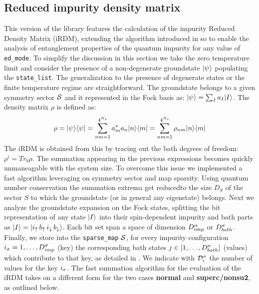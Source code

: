 \documentclass[edipack2.tex]{subfiles}
\begin{document}
\subsection{Reduced impurity density matrix}\label{sSecRDM}
This version of the \NAME library features the calculation of the
impurity Reduced Density Matrix (iRDM), extending the algorithm introduced in  so to enable the analysis of
entanglement properties of the quantum impurity for any value of {\tt
  ed\_mode}.
To simplify the discussion in this section we take the zero
temperature limit and consider the presence of a non-degenerate
groundstate $|\psi\rangle$ populating the {\tt state\_list}.
The generalization to the presence of degenerate states or the finite
temperature regime are straightforward.
The groundstate belongs to a given symmetry sector ${\cal S}$ and it
represented in the Fock basis as:  $|\psi\rangle = \sum_I a_I |I\rangle$. 
The density matrix $\rho$ is defined as:
$$
\rho = |\psi\rangle\langle \psi| = \sum_{nm=1}^{4^{N_s}} a^*_ma_n |n\rangle\langle m| =\sum_{nm=1}^{4^{N_s}} \rho_{nm} |n\rangle\langle m| 
$$
The iRDM is obtained from this by tracing out the bath degrees of
freedom: $\rho^{i}=Tr_{b}\rho$. The summation appearing in the
previous expressions becomes quickly unmaneagable with the system
size. To overcome this issue we implemented a fast algorithm
leveraging on symmetry sector and map sparsity.
Using quantum number conservation the summation extrema get reducedto
the size $D_S$ of the sector $S$ to which the groundstate (or in
general any eigenstate) belongs. 
Next we analyze the groundstate expansion on the Fock states, splitting the bit representation of any state $|I\rangle$ into
their spin-dependent impurity and bath parts as $|I\rangle = |
  i_\uparrow\,  b_\uparrow\, i_\downarrow \, b_\downarrow\rangle$. Each bit
set span a space of dimension $D^\alpha_{imp}$ or $D^\sigma_{bath}$. 
Finally, we store into the {\tt sparse\_map} ${\cal S}$, for every impurity configuration 
$i_\sigma =1,\dots,D^\sigma_{imp}$ (key) the corresponding bath states $j\in[1,\dots,D^\sigma_{bath}]$
(values) which contribute to that key, as detailed in
.
We indicate with ${\cal D}^\sigma_{i}$ the number of values for the key $i_\sigma$.
The fast summation algorithm for the evaluation of the iRDM takes on a
different form for the two cases {\bf normal} and {\bf superc/nonsu2},
as outlined below.
\end{document}
